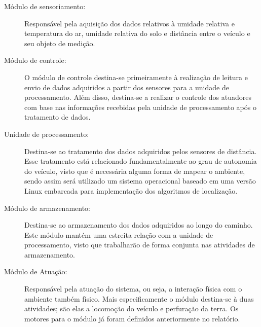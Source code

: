 \begin{description}
\item[Módulo de sensoriamento:] Responsável pela aquisição dos dados relativos à
umidade relativa e temperatura do ar, umidade relativa do solo e distância
entre o veículo e seu objeto de medição.
\item[Módulo de controle:] O módulo de controle destina-se primeiramente à
realização de leitura e envio de dados adquiridos a partir dos sensores
para a unidade de processamento. Além disso, destina-se a realizar o
controle dos atuadores com base nas informações recebidas pela unidade de processamento após o tratamento de dados.
\item[Unidade de processamento:] Destina-se ao tratamento dos dados
adquiridos pelos sensores de distância. Esse tratamento está relacionado
fundamentalmente ao grau de autonomia do veículo, visto que é necessária
alguma forma de mapear o ambiente, sendo assim será utilizado um sistema
operacional baseado em uma versão Linux embarcada para implementação
dos algoritmos de localização.
\item[Módulo de armazenamento:] Destina-se ao armazenamento dos dados
adquiridos ao longo do caminho. Este módulo mantém uma estreita relação
com a unidade de processamento, visto que trabalharão de forma conjunta
nas atividades de armazenamento.
\item[Módulo de Atuação:] Responsável pela atuação do sistema, ou seja,
a interação física com o ambiente também físico. Mais especificamente
o módulo destina-se à duas atividades; são elas a locomoção do veículo
e perfuração da terra. Os motores para o módulo já foram definidos
anteriormente no relatório.
\end{description}
